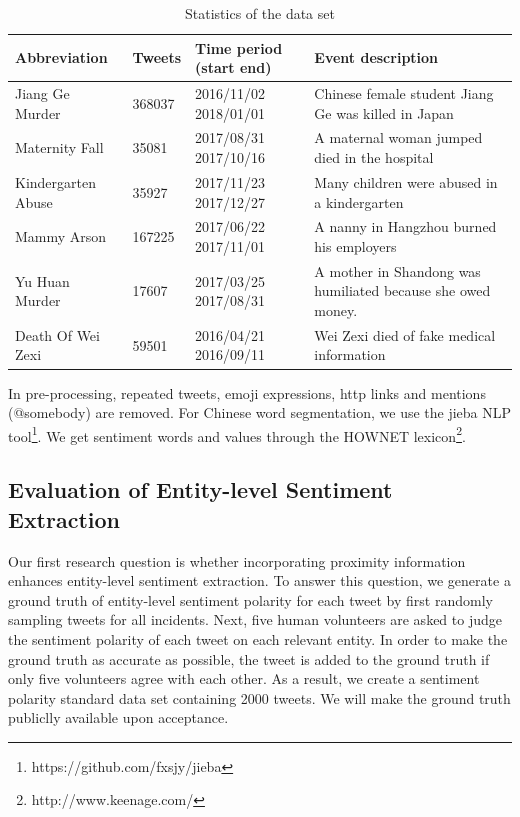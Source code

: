 \documentclass[runningheads]{llncs}
\begin{document}
\vspace{-0.6cm}
\begin{table}
\begin{center}
\tiny
\begin{tabular}{|l|l|l|l|}
\hline
Abbreviation   & Tweets & Time period (start end) & Event description                                           \\ \hline
Jiang Ge Murder      & 368037 & 2016/11/02 2018/01/01   & Chinese female student Jiang Ge was killed in Japan         \\ \hline
Maternity Fall        & 35081  & 2017/08/31 2017/10/16   & A maternal woman jumped died in the hospital                \\ \hline
Kindergarten Abuse     & 35927  & 2017/11/23 2017/12/27   & Many children were abused in a kindergarten                 \\ \hline
Mammy Arson  & 167225 & 2017/06/22 2017/11/01   & A nanny in Hangzhou burned his employers                    \\ \hline
Yu Huan Murder & 17607  & 2017/03/25 2017/08/31   & A mother in Shandong was humiliated because she owed money. \\ \hline
Death Of Wei Zexi   & 59501  & 2016/04/21 2016/09/11   & Wei Zexi died of fake medical information                   \\ \hline
\end{tabular}
\end{center}
\caption{Statistics of the data set}\label{table:social event}
\label{default}
\end{table}

\vspace{-0.6cm}
In pre-processing, repeated tweets, emoji expressions, http links and mentions (@somebody) are removed. For Chinese word segmentation, we use the jieba NLP tool\footnote{https://github.com/fxsjy/jieba}. We get sentiment words and values through the HOWNET lexicon\footnote{http://www.keenage.com/}. 



\subsection{Evaluation of Entity-level Sentiment Extraction}\label{sec:Evaluation of Entity-level Sentiment Extraction}
Our first research question is whether incorporating proximity information enhances entity-level sentiment extraction. To answer this question, we generate a ground truth of entity-level sentiment polarity for each tweet by first randomly sampling tweets 
for all incidents. Next, five human volunteers are asked to judge the sentiment polarity of each tweet on each relevant entity. In order to make the ground truth as accurate as possible, the tweet is added to the ground truth if only five volunteers agree with each other. 
As a result, we create a sentiment polarity standard data set containing 2000 tweets.
We will make the ground truth publiclly available upon acceptance. 
\end{document}
